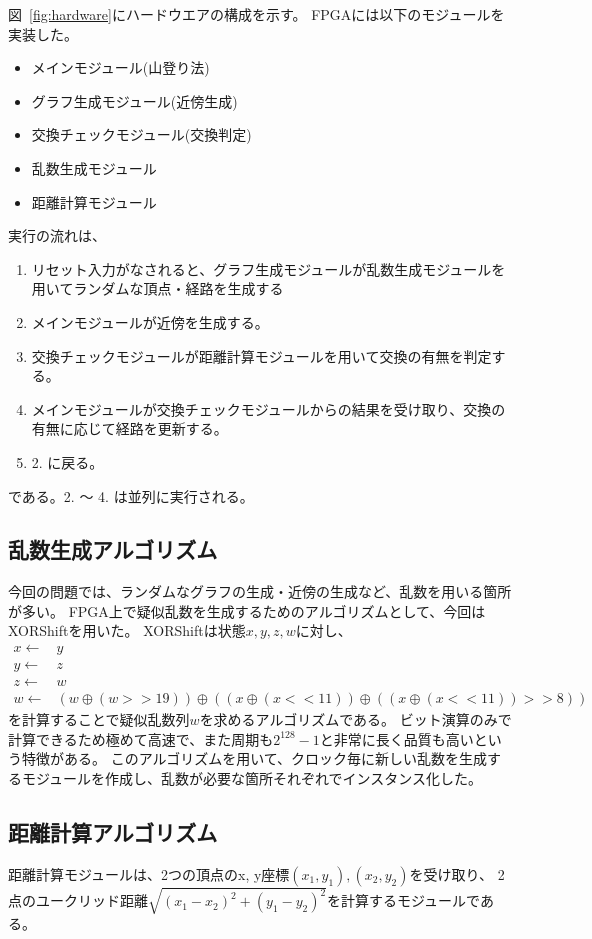 図~\ref{fig:hardware}にハードウエアの構成を示す。
FPGAには以下のモジュールを実装した。
\begin{itemize}
    \item メインモジュール(山登り法)
    \item グラフ生成モジュール(近傍生成)
    \item 交換チェックモジュール(交換判定)
    \item 乱数生成モジュール
    \item 距離計算モジュール
\end{itemize}
実行の流れは、
\begin{enumerate}
    \item リセット入力がなされると、グラフ生成モジュールが乱数生成モジュールを用いてランダムな頂点・経路を生成する
    \item メインモジュールが近傍を生成する。
    \item 交換チェックモジュールが距離計算モジュールを用いて交換の有無を判定する。
    \item メインモジュールが交換チェックモジュールからの結果を受け取り、交換の有無に応じて経路を更新する。
    \item 2. に戻る。
\end{enumerate}
である。2. ～ 4. は並列に実行される。

\subsection{乱数生成アルゴリズム}
今回の問題では、ランダムなグラフの生成・近傍の生成など、乱数を用いる箇所が多い。
FPGA上で疑似乱数を生成するためのアルゴリズムとして、今回はXORShiftを用いた。
XORShiftは状態$x, y, z, w$に対し、
\begin{align*}
    x \leftarrow& y \\
    y \leftarrow& z \\
    z \leftarrow& w \\
    w \leftarrow& (w\oplus(w>>19))\oplus((x\oplus(x<<11))\oplus((x\oplus(x<<11))>>8))
\end{align*}
を計算することで疑似乱数列${w}$を求めるアルゴリズムである。
ビット演算のみで計算できるため極めて高速で、また周期も$2^{128}-1$と非常に長く品質も高いという特徴がある。\cite{JSSv008i14}
このアルゴリズムを用いて、クロック毎に新しい乱数を生成するモジュールを作成し、乱数が必要な箇所それぞれでインスタンス化した。

\subsection{距離計算アルゴリズム}\label{sec:distance}
距離計算モジュールは、2つの頂点のx, y座標$(x_1, y_1), (x_2, y_2)$を受け取り、
2点のユークリッド距離$\sqrt{(x_1-x_2)^2+(y_1-y_2)^2}$を計算するモジュールである。

